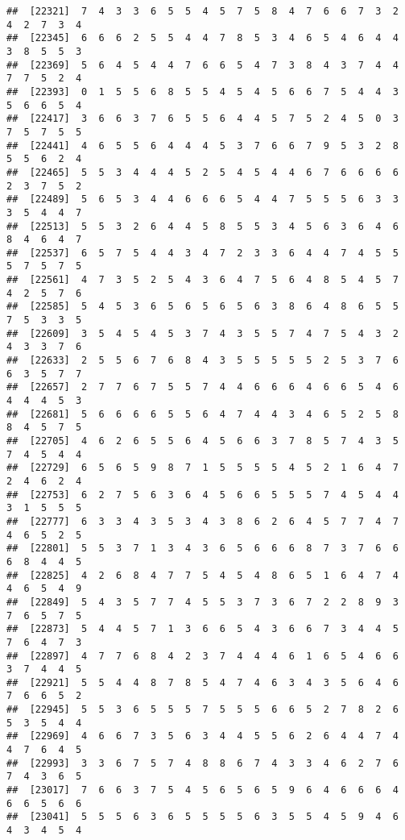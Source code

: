 \documentclass[
]{book}
\begin{document}
\begin{verbatim}
##  [22321]  7  4  3  3  6  5  5  4  5  7  5  8  4  7  6  6  7  3  2  4  2  7  3  4
##  [22345]  6  6  6  2  5  5  4  4  7  8  5  3  4  6  5  4  6  4  4  3  8  5  5  3
##  [22369]  5  6  4  5  4  4  7  6  6  5  4  7  3  8  4  3  7  4  4  7  7  5  2  4
##  [22393]  0  1  5  5  6  8  5  5  4  5  4  5  6  6  7  5  4  4  3  5  6  6  5  4
##  [22417]  3  6  6  3  7  6  5  5  6  4  4  5  7  5  2  4  5  0  3  7  5  7  5  5
##  [22441]  4  6  5  5  6  4  4  4  5  3  7  6  6  7  9  5  3  2  8  5  5  6  2  4
##  [22465]  5  5  3  4  4  4  5  2  5  4  5  4  4  6  7  6  6  6  6  2  3  7  5  2
##  [22489]  5  6  5  3  4  4  6  6  6  5  4  4  7  5  5  5  6  3  3  3  5  4  4  7
##  [22513]  5  5  3  2  6  4  4  5  8  5  5  3  4  5  6  3  6  4  6  8  4  6  4  7
##  [22537]  6  5  7  5  4  4  3  4  7  2  3  3  6  4  4  7  4  5  5  5  7  5  7  5
##  [22561]  4  7  3  5  2  5  4  3  6  4  7  5  6  4  8  5  4  5  7  4  2  5  7  6
##  [22585]  5  4  5  3  6  5  6  5  6  5  6  3  8  6  4  8  6  5  5  7  5  3  3  5
##  [22609]  3  5  4  5  4  5  3  7  4  3  5  5  7  4  7  5  4  3  2  4  3  3  7  6
##  [22633]  2  5  5  6  7  6  8  4  3  5  5  5  5  5  2  5  3  7  6  6  3  5  7  7
##  [22657]  2  7  7  6  7  5  5  7  4  4  6  6  6  4  6  6  5  4  6  4  4  4  5  3
##  [22681]  5  6  6  6  6  5  5  6  4  7  4  4  3  4  6  5  2  5  8  8  4  5  7  5
##  [22705]  4  6  2  6  5  5  6  4  5  6  6  3  7  8  5  7  4  3  5  7  4  5  4  4
##  [22729]  6  5  6  5  9  8  7  1  5  5  5  5  4  5  2  1  6  4  7  2  4  6  2  4
##  [22753]  6  2  7  5  6  3  6  4  5  6  6  5  5  5  7  4  5  4  4  3  1  5  5  5
##  [22777]  6  3  3  4  3  5  3  4  3  8  6  2  6  4  5  7  7  4  7  4  6  5  2  5
##  [22801]  5  5  3  7  1  3  4  3  6  5  6  6  6  8  7  3  7  6  6  6  8  4  4  5
##  [22825]  4  2  6  8  4  7  7  5  4  5  4  8  6  5  1  6  4  7  4  4  6  5  4  9
##  [22849]  5  4  3  5  7  7  4  5  5  3  7  3  6  7  2  2  8  9  3  7  6  5  7  5
##  [22873]  5  4  4  5  7  1  3  6  6  5  4  3  6  6  7  3  4  4  5  7  6  4  7  3
##  [22897]  4  7  7  6  8  4  2  3  7  4  4  4  6  1  6  5  4  6  6  3  7  4  4  5
##  [22921]  5  5  4  4  8  7  8  5  4  7  4  6  3  4  3  5  6  4  6  7  6  6  5  2
##  [22945]  5  5  3  6  5  5  5  7  5  5  5  6  6  5  2  7  8  2  6  5  3  5  4  4
##  [22969]  4  6  6  7  3  5  6  3  4  4  5  5  6  2  6  4  4  7  4  4  7  6  4  5
##  [22993]  3  3  6  7  5  7  4  8  8  6  7  4  3  3  4  6  2  7  6  7  4  3  6  5
##  [23017]  7  6  6  3  7  5  4  5  6  5  6  5  9  6  4  6  6  6  4  6  6  5  6  6
##  [23041]  5  5  5  6  3  6  5  5  5  5  6  3  5  5  4  5  9  4  6  4  3  4  5  4

\end{verbatim}
\end{document}
